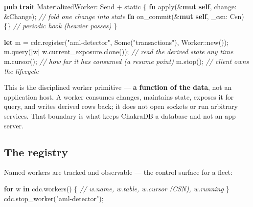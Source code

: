 \documentclass[
  11pt,
  openany]{book}
\newenvironment{Shaded}{}{}
\newcommand{\BuiltInTok}[1]{\textcolor[rgb]{0.00,0.50,0.00}{#1}}
\newcommand{\CommentTok}[1]{\textcolor[rgb]{0.38,0.63,0.69}{\textit{#1}}}
\newcommand{\ConstantTok}[1]{\textcolor[rgb]{0.53,0.00,0.00}{#1}}
\newcommand{\ControlFlowTok}[1]{\textcolor[rgb]{0.00,0.44,0.13}{\textbf{#1}}}
\newcommand{\KeywordTok}[1]{\textcolor[rgb]{0.00,0.44,0.13}{\textbf{#1}}}
\newcommand{\NormalTok}[1]{#1}
\newcommand{\OperatorTok}[1]{\textcolor[rgb]{0.40,0.40,0.40}{#1}}
\newcommand{\OtherTok}[1]{\textcolor[rgb]{0.00,0.44,0.13}{#1}}
\newcommand{\PreprocessorTok}[1]{\textcolor[rgb]{0.74,0.48,0.00}{#1}}
\newcommand{\StringTok}[1]{\textcolor[rgb]{0.25,0.44,0.63}{#1}}
\begin{document}
\begin{Shaded}
\begin{Highlighting}[]
\KeywordTok{pub} \KeywordTok{trait}\NormalTok{ MaterializedWorker}\OperatorTok{:} \BuiltInTok{Send} \OperatorTok{+} \OtherTok{\textquotesingle{}static} \OperatorTok{\{}
    \KeywordTok{fn}\NormalTok{ apply(}\OperatorTok{\&}\KeywordTok{mut} \KeywordTok{self}\OperatorTok{,}\NormalTok{ change}\OperatorTok{:} \OperatorTok{\&}\NormalTok{Change)}\OperatorTok{;}      \CommentTok{// fold one change into state}
    \KeywordTok{fn}\NormalTok{ on\_commit(}\OperatorTok{\&}\KeywordTok{mut} \KeywordTok{self}\OperatorTok{,}\NormalTok{ \_csn}\OperatorTok{:}\NormalTok{ Csn) }\OperatorTok{\{\}}      \CommentTok{// periodic hook (heavier passes)}
\OperatorTok{\}}

\KeywordTok{let}\NormalTok{ m }\OperatorTok{=}\NormalTok{ cdc}\OperatorTok{.}\NormalTok{register(}\StringTok{"aml{-}detector"}\OperatorTok{,} \ConstantTok{Some}\NormalTok{(}\StringTok{"transactions"}\NormalTok{)}\OperatorTok{,} \PreprocessorTok{Worker::}\NormalTok{new())}\OperatorTok{;}
\NormalTok{m}\OperatorTok{.}\NormalTok{query(}\OperatorTok{|}\NormalTok{w}\OperatorTok{|}\NormalTok{ w}\OperatorTok{.}\NormalTok{current\_exposure}\OperatorTok{.}\NormalTok{clone())}\OperatorTok{;}       \CommentTok{// read the derived state any time}
\NormalTok{m}\OperatorTok{.}\NormalTok{cursor()}\OperatorTok{;}                                    \CommentTok{// how far it has consumed (a resume point)}
\NormalTok{m}\OperatorTok{.}\NormalTok{stop()}\OperatorTok{;}                                      \CommentTok{// client owns the lifecycle}
\end{Highlighting}
\end{Shaded}

This is the disciplined worker primitive --- \textbf{a function of the
data}, not an application host. A worker consumes changes, maintains
state, exposes it for query, and writes derived rows back; it does not
open sockets or run arbitrary services. That boundary is what keeps
ChakraDB a database and not an app server.

\subsection{The registry}\label{the-registry}

Named workers are tracked and observable --- the control surface for a
fleet:

\begin{Shaded}
\begin{Highlighting}[]
\ControlFlowTok{for}\NormalTok{ w }\KeywordTok{in}\NormalTok{ cdc}\OperatorTok{.}\NormalTok{workers() }\OperatorTok{\{}
    \CommentTok{// w.name, w.table, w.cursor (CSN), w.running}
\OperatorTok{\}}
\NormalTok{cdc}\OperatorTok{.}\NormalTok{stop\_worker(}\StringTok{"aml{-}detector"}\NormalTok{)}\OperatorTok{;}
\end{Highlighting}
\end{Shaded}
\end{document}
